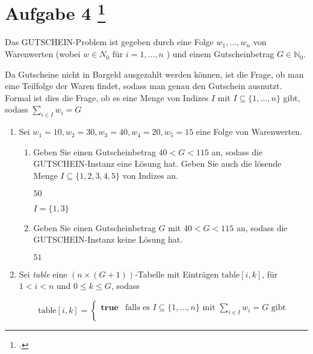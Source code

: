 \documentclass{lehramt-informatik-aufgabe}
\begin{document}
\section{Aufgabe 4
\footcite{66115:2020:09}}

Das GUTSCHEIN-Problem ist gegeben durch eine Folge $w_1, \dots, w_n$ von
Warenwerten (wobei $w \in N_0$ für $i = 1, \dots, n$ ) und einem
Gutscheinbetrag $G \in \mathbb{N}_0$.

Da Gutscheine nicht in Bargeld ausgezahlt werden können, ist die Frage,
ob man eine Teilfolge der Waren findet, sodass man genau den Gutschein
ausnutzt. Formal ist dies die Frage, ob es eine Menge von Indizes $I$
mit $I \subseteq \{1, \dots, n \}$ gibt, sodass $\sum_{i \in I} w_i = G$
\begin{enumerate}


\item Sei $w_1 = 10, w_2 = 30, w_3 = 40, w_4 = 20, w_5 = 15$ eine Folge
von Warenwerten.

\begin{enumerate}


\item Geben Sie einen Gutscheinbetrag $40 < G < 115$ an, sodass die
GUT\-SCHEIN-Instanz eine Lösung hat. Geben Sie auch die lösende Menge $I
\subseteq \{ 1, 2, 3, 4, 5 \}$ von Indizes an.

\begin{liAntwort}
$50$

$I = \{ 1, 3 \}$
\end{liAntwort}


\item Geben Sie einen Gutscheinbetrag $G$ mit $40 < G < 115$ an, sodass
die GUTSCHEIN-Instanz keine Lösung hat.

\begin{liAntwort}
$51$
\end{liAntwort}

\end{enumerate}


\item Sei \emph{table} eine $(n \times (G + 1))$-Tabelle mit Einträgen
$\text{table}[i,k]$, für $1 < i < n$ und $0 \leq k \leq G$, sodass

\begin{liAntwort}
\begin{equation*}
\text{table}[i,k] =
\begin{cases}
\textbf{true} &
\text{falls es } I \subseteq \{1, \dots, n \} \text{ mit }
\sum_{i \in I} w_i = G \text{ gibt}\\


\end{cases}
\end{equation*}
\end{liAntwort}
\end{enumerate}
\end{document}
